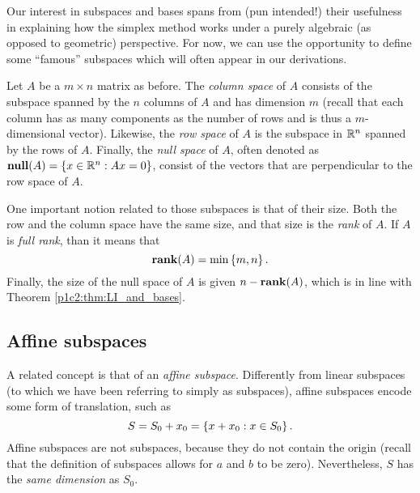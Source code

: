 
Our interest in subspaces and bases spans from (pun intended!) their usefulness in explaining how the simplex method works under a purely algebraic (as opposed to geometric) perspective. For now, we can use the opportunity to define some ``famous'' subspaces which will often appear in our derivations. 

Let $A$ be a $m \times n$ matrix as before. The \emph{column space} of $A$ consists of the subspace spanned by the $n$ columns of $A$ and has dimension $m$ (recall that each column has as many components as the number of rows and is thus a $m$-dimensional vector). Likewise, the \emph{row space} of $A$ is the subspace in $\mathbb{R}^n$ spanned by the rows of $A$. Finally, the \emph{null space} of $A$, often denoted as $\mathop{\bf null}(A) = \left\{ x \in \mathbb{R}^n : Ax = 0 \right \}$, consist of the vectors that are perpendicular to the row space of $A$. 

One important notion related to those subspaces is that of their size. Both the row and the column space have the same size, and that size is the \emph{rank} of $A$. If $A$ is \emph{full rank}, than it means that 
%
\begin{equation*}
	\mathop{\bf rank}(A) = \min \left\{ m,n \right \}. 		
\end{equation*}
%
Finally, the size of the null space of $A$ is given $n - \mathop{\bf rank}(A)$, which is in line with Theorem \ref{p1c2:thm:LI_and_bases}.


\subsection{Affine subspaces}

A related concept is that of an \emph{affine subspace}. Differently from linear subspaces (to which we have been referring to simply as subspaces), affine subspaces encode some form of translation, such as  
%
\begin{equation*}
	S = S_0 + x_0 = \left\{ x + x_0 : x \in S_0 \right \}.
\end{equation*}
%
Affine subspaces are not subspaces, because they do not contain the origin (recall that the definition of subspaces allows for $a$ and $b$ to be zero). Nevertheless, $S$ has the \emph{same dimension} as $S_0$.

